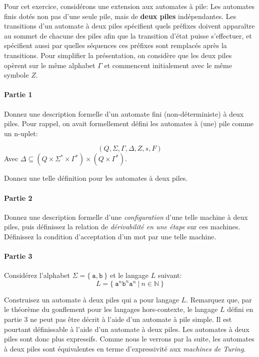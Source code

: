 \documentclass[12pt,french,a4paper]{article}
\begin{document}
\begin{question}
Pour cet exercice, considérons une extension aux automates à pile:
Les automates finis dotés non pas d'une seule pile, mais de \textbf{deux piles} indépendantes.
Les transitions d'un automate à deux piles spécifient quels préfixes doivent apparaître au sommet de chacune des piles afin que la transition d'état puisse s'effectuer, et spécifient aussi par quelles séquences ces préfixes sont remplacés après la transitions.
Pour simplifier la présentation, on considère que les deux piles opèrent sur le même alphabet $\Gamma$ et commencent initialement avec le même symbole $Z$.

\paragraph{Partie 1}

Donnez une description formelle d'un automate fini (non-déterministe) à deux piles.
Pour rappel, on avait formellement défini les automates à (une) pile comme un n-uplet:

\[
(Q, \Sigma, \Gamma, \Delta, Z, s, F)
\]
Avec $\Delta \subseteq (Q \times \Sigma^* \times \Gamma^*) \times (Q \times \Gamma^*)$.

Donnez une telle définition pour les automates à deux piles.

\paragraph{Partie 2}

Donnez une description formelle d'une \textit{configuration} d'une telle machine à deux piles, puis définissez la relation de \textit{dérivabilité en une étape} sur ces machines. Définissez la condition d'acceptation d'un mot par une telle machine.

\paragraph{Partie 3}

Considérez l'alphabet $\Sigma = \{\ \texttt{a}, \texttt{b}\ \}$ et le langage $L$ suivant:
\[
L = \{\ \texttt{a}^n\texttt{b}^n\texttt{a}^n\ |\ n \in \mathbb{N} \ \}
\]

Construisez un automate à deux piles qui a pour langage $L$.
Remarquez que, par le théorème du gonflement pour les langages hors-contexte, le langage $L$ défini en partie 3 ne peut pas être décrit à l'aide d'un automate à pile simple. Il est pourtant définissable à l'aide d'un automate à deux piles.
Les automates à deux piles sont donc plus expressifs.
Comme nous le verrons par la suite, les automates à deux piles sont équivalentes en terme d'expressivité aux \textit{machines de Turing}.

\end{question}
\end{document}
